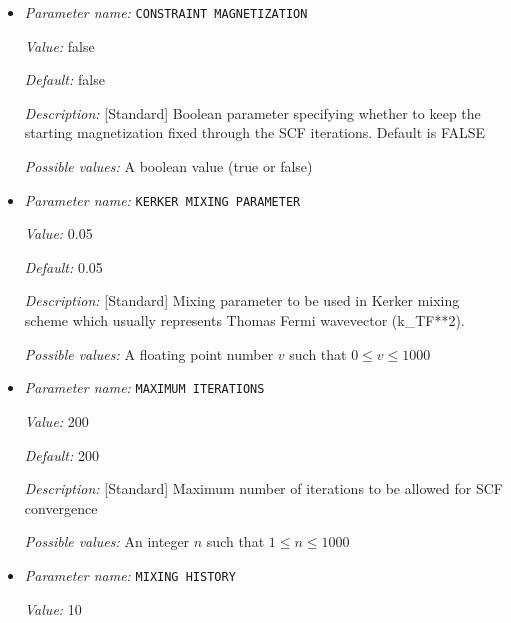 \begin{itemize}
{\it Possible values:} A boolean value (true or false)
\item {\it Parameter name:} {\tt CONSTRAINT MAGNETIZATION}
\label{parameters:SCF parameters/CONSTRAINT MAGNETIZATION}
\label{parameters:SCF_20parameters/CONSTRAINT_20MAGNETIZATION}


{\it Value:} false


{\it Default:} false


{\it Description:} [Standard] Boolean parameter specifying whether to keep the starting magnetization fixed through the SCF iterations. Default is FALSE


{\it Possible values:} A boolean value (true or false)
\item {\it Parameter name:} {\tt KERKER MIXING PARAMETER}
\label{parameters:SCF parameters/KERKER MIXING PARAMETER}
\label{parameters:SCF_20parameters/KERKER_20MIXING_20PARAMETER}


{\it Value:} 0.05


{\it Default:} 0.05


{\it Description:} [Standard] Mixing parameter to be used in Kerker mixing scheme which usually represents Thomas Fermi wavevector (k\_{TF}**2).


{\it Possible values:} A floating point number $v$ such that $0 \leq v \leq 1000$
\item {\it Parameter name:} {\tt MAXIMUM ITERATIONS}
\label{parameters:SCF parameters/MAXIMUM ITERATIONS}
\label{parameters:SCF_20parameters/MAXIMUM_20ITERATIONS}


{\it Value:} 200


{\it Default:} 200


{\it Description:} [Standard] Maximum number of iterations to be allowed for SCF convergence


{\it Possible values:} An integer $n$ such that $1\leq n \leq 1000$
\item {\it Parameter name:} {\tt MIXING HISTORY}
\label{parameters:SCF parameters/MIXING HISTORY}
\label{parameters:SCF_20parameters/MIXING_20HISTORY}


{\it Value:} 10



\end{itemize}
